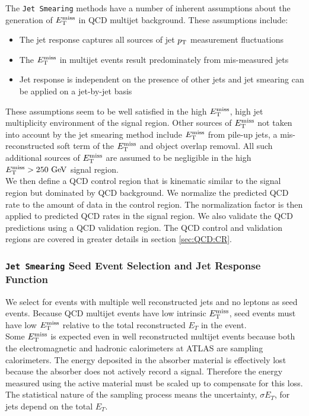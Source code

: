 \indent The {\tt Jet Smearing} methods have a number of inherent assumptions about the generation of $E_{\mathrm{T}}^{\mathrm{miss}}$ in QCD multijet background.  These assumptions include: \\

\begin{itemize}
\item The jet response captures all sources of jet $p_{\mathrm{T}}$ measurement fluctuations
\item The $E_{\mathrm{T}}^{\mathrm{miss}}$ in multijet events result predominately from mis-measured jets
\item Jet response is independent on the presence of other jets and jet smearing can be applied on a jet-by-jet basis
\end{itemize}

\indent These assumptions seem to be well satisfied in the high $E_{\mathrm{T}}^{\mathrm{miss}}$, high jet multiplicity environment of the signal region.  Other sources of $E_{\mathrm{T}}^{\mathrm{miss}}$ not taken into account by the jet smearing method include $E_{\mathrm{T}}^{\mathrm{miss}}$ from pile-up jets, a mis-reconstructed soft term of the $E_{\mathrm{T}}^{\mathrm{miss}}$ and object overlap removal.  All such additional sources of $E_{\mathrm{T}}^{\mathrm{miss}}$ are assumed to be negligible in the high $\met > 250 \gev$ signal region. \\

\indent We then define a QCD control region that is kinematic similar to the signal region but dominated by QCD background.  We normalize the predicted QCD rate to the amount of data in the control region.  The normalization factor is then applied to predicted QCD rates in the signal region.  We also validate the QCD predictions using a QCD validation region.  The QCD control and validation regions are covered in greater details in section \ref{sec:QCD:CR}. \\

\subsubsection{{\tt Jet Smearing} Seed Event Selection and Jet Response Function}

\indent We select for events with multiple well reconstructed jets and no leptons as seed events.  Because QCD multijet events have low intrinsic $E_{\mathrm{T}}^{\mathrm{miss}}$, seed events must have low $E_{\mathrm{T}}^{\mathrm{miss}}$ relative to the total reconstructed $E_T$ in the event. \\ 

\indent Some $E_{\mathrm{T}}^{\mathrm{miss}}$ is expected even in well reconstructed multijet events because both the electromagnetic and hadronic calorimeters at ATLAS are sampling calorimeters.  The energy deposited in the absorber material is effectively lost because the absorber does not actively record a signal.  Therefore the energy measured using the active material must be scaled up to compensate for this loss.  The statistical nature of the sampling process means the uncertainty, $\sigma E_T$, for jets depend on the total $E_T$.   \\

